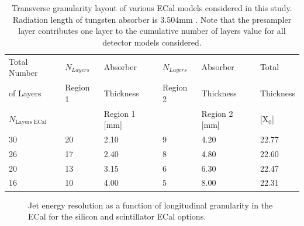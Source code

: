 \begin{table}[h!]
\centering
\begin{tabular}{ l l l l l l}
\hline
Total Number & $N_{Layers}$ & Absorber & $N_{Layers}$ & Absorber & Total  \\
of Layers & Region 1 & Thickness & Region 2 & Thickness & Thickness \\
$N_{\text{Layers ECal}}$ & & Region 1 [mm] & &  Region 2 [mm] &  [$\text{X}_{0}$] \\

\hline
30 & 20 & 2.10 & 9 & 4.20 & 22.77 \\
26 & 17 & 2.40 & 8 & 4.80 & 22.60 \\
20 & 13 & 3.15 & 6 & 6.30 & 22.47 \\
16 & 10 & 4.00 & 5 & 8.00 & 22.31\\
\hline
\end{tabular}
\caption[Transverse granularity layout of various ECal models considered in this study.]{Transverse granularity layout of various ECal models considered in this study.  Radiation length of tungsten absorber is 3.504mm \cite{Olive:2016xmw}.  Note that the presampler layer contributes one layer to the cumulative number of layers value for all detector models considered.}
\label{table:nlayersecaloption}
\end{table}

\begin{figure}
\centering
{}
 \hfill
\caption[Jet energy resolution as a function of longitudinal granularity in the ECal.]{Jet energy resolution as a function of longitudinal granularity in the ECal for the silicon and scintillator ECal options.}
\label{fig:ecalnlayers}
\end{figure}

